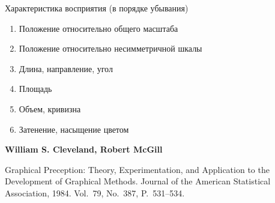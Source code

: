 \documentclass[xcolor=dvipsnames, 12pt]{beamer}
\begin{document}
    
  \begin{frame}{Характеристика восприятия (в порядке убывания)}
  
\begin{enumerate}%

\item Положение относительно общего масштаба

\vskip0.2cm

\item Положение относительно несимметричной шкалы

\vskip0.2cm

\item Длина, направление, угол

\vskip0.2cm

\item Площадь

\vskip0.2cm

\item Объем, кривизна

\vskip0.2cm

\item Затенение, насыщение цветом

\end{enumerate}

\begin{thebibliography}{99}
{\scriptsize
\textbf{William S. Cleveland, Robert McGill}

Graphical Preception: Theory, Experimentation, and Application to the Development of Graphical Methods. Journal of the American Statistical Association, 1984. Vol.~79, No.~387, P.~531--534. 

}

\end{thebibliography}
  
\end{frame}
  
\end{document}
